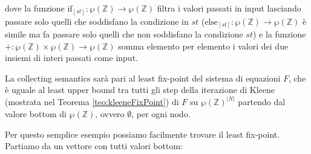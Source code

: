 \begin{example}
dove la funzione \(\textrm{if}_{[st]}:\wp(\mathbb{Z})\rightarrow\wp(\mathbb{Z})\) filtra i valori passati in input lasciando passare solo quelli che soddisfano la condizione in \(st\) (\(\textrm{else}_{[st]}:\wp(\mathbb{Z})\rightarrow\wp(\mathbb{Z})\) è simile ma fa passare solo quelli che non soddisfano la condizione \(st\)) e la funzione \(+:\wp(\mathbb{Z})\times\wp(\mathbb{Z})\rightarrow\wp(\mathbb{Z})\) somma elemento per elemento i valori dei due insiemi di interi passati come input. 

La collecting semantics sarà pari al least fix-point del sistema di equazioni \(F\), che è uguale al least upper bound tra tutti gli step della iterazione di Kleene (mostrata nel Teorema \ref{teo:kleeneFixPoint}) di \(F\) su \(\wp(\mathbb{Z})^{|N|}\) partendo dal valore bottom di \(\wp(\mathbb{Z})\), ovvero \(\emptyset\), per ogni nodo.  

Per questo semplice esempio possiamo facilmente trovare il least fix-point. Partiamo da un vettore con tutti valori bottom:


\end{example}
